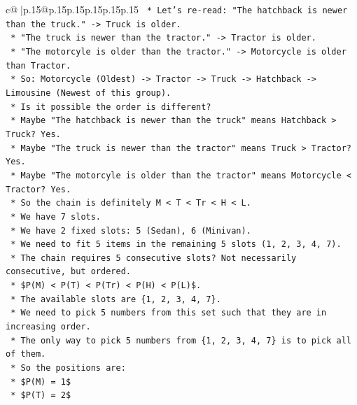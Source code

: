 \documentclass{article}
\begin{document}
{\begin{supertabular}{c@{$\;$}|p{.15\linewidth}@{}p{.15\linewidth}p{.15\linewidth}p{.15\linewidth}p{.15\linewidth}p{.15\linewidth}}
{{{\texttt{                    *   Let's re{-}read: "The hatchback is newer than the truck." {-}> Truck is older.} \\
\texttt{                    *   "The truck is newer than the tractor." {-}> Tractor is older.} \\
\texttt{                    *   "The motorcyle is older than the tractor." {-}> Motorcycle is older than Tractor.} \\
\texttt{                    *   So: Motorcycle (Oldest) {-}> Tractor {-}> Truck {-}> Hatchback {-}> Limousine (Newest of this group).} \\
\texttt{                    *   Is it possible the order is different?} \\
\texttt{                    *   Maybe "The hatchback is newer than the truck" means Hatchback > Truck? Yes.} \\
\texttt{                    *   Maybe "The truck is newer than the tractor" means Truck > Tractor? Yes.} \\
\texttt{                    *   Maybe "The motorcyle is older than the tractor" means Motorcycle < Tractor? Yes.} \\
\texttt{                    *   So the chain is definitely M < T < Tr < H < L.} \\
\texttt{                    *   We have 7 slots.} \\
\texttt{                    *   We have 2 fixed slots: 5 (Sedan), 6 (Minivan).} \\
\texttt{                    *   We need to fit 5 items in the remaining 5 slots (1, 2, 3, 4, 7).} \\
\texttt{                    *   The chain requires 5 consecutive slots? Not necessarily consecutive, but ordered.} \\
\texttt{                    *   \$P(M) < P(T) < P(Tr) < P(H) < P(L)\$.} \\
\texttt{                    *   The available slots are \{1, 2, 3, 4, 7\}.} \\
\texttt{                    *   We need to pick 5 numbers from this set such that they are in increasing order.} \\
\texttt{                    *   The only way to pick 5 numbers from \{1, 2, 3, 4, 7\} is to pick all of them.} \\
\texttt{                    *   So the positions are:} \\
\texttt{                        *   \$P(M) = 1\$} \\
\texttt{                        *   \$P(T) = 2\$} \\
}}}
\end{supertabular}}
\end{document}
